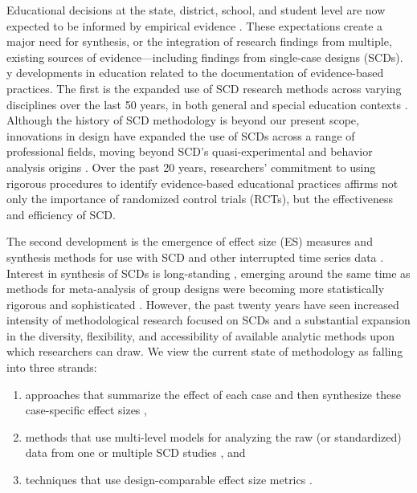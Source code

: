 \documentclass[
]{book}
\providecommand{\tightlist}{%
  \setlength{\itemsep}{0pt}\setlength{\parskip}{0pt}}
\begin{document}
Educational decisions at the state, district, school, and student level are now expected to be informed by empirical evidence \citep{2014Council, whatworksclearinghouse2020What}.
These expectations create a major need for synthesis, or the integration of research findings from multiple, existing sources of evidence---including findings from single-case designs (SCDs). \citep{cooper2010Research, pustejovsky2017Research}y developments in education related to the documentation of evidence-based practices.
The first is the expanded use of SCD research methods across varying disciplines over the last 50 years, in both general and special education contexts \citep{kratochwill2013SingleCase}.
Although the history of SCD methodology is beyond our present scope, innovations in design have expanded the use of SCDs across a range of professional fields, moving beyond SCD's quasi-experimental and behavior analysis origins \citep[see][ for more detailed information on the history of SCD]{kratochwill2013SingleCase}.
Over the past 20 years, researchers' commitment to using rigorous procedures to identify evidence-based educational practices affirms not only the importance of randomized control trials (RCTs), but the effectiveness and efficiency of SCD.

The second development is the emergence of effect size (ES) measures and synthesis methods for use with SCD and other interrupted time series data \citep{shadish2015Role, Swaminathan2014effect}.
Interest in synthesis of SCDs is long-standing \citep[e.g.,][]{Center1985methodology, Gingerich1984meta, White1987some}, emerging around the same time as methods for meta-analysis of group designs were becoming more statistically rigorous and sophisticated \citep{hedges1985statistical, shadish2015metaanalytic}.
However, the past twenty years have seen increased intensity of methodological research focused on SCDs and a substantial expansion in the diversity, flexibility, and accessibility of available analytic methods upon which researchers can draw.
We view the current state of methodology as falling into three strands:

\begin{enumerate}
\def\labelenumi{\alph{enumi})}
\tightlist
\item
  approaches that summarize the effect of each case and then synthesize these case-specific effect sizes \citep[e.g.,][]{pustejovsky2018Using},
\item
  methods that use multi-level models for analyzing the raw (or standardized) data from one or multiple SCD studies \citep{VandenNoortgate2008multilevel}, and
\item
  techniques that use design-comparable effect size metrics \citep{Hedges2012ABk, Hedges2012MB, Pustejovsky2014design, Shadish2013d, Swaminathan2014effect}.
\end{enumerate}
\end{document}
